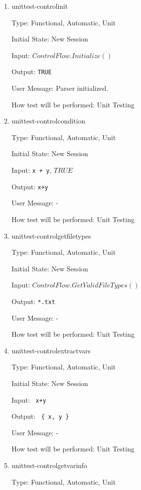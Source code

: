 \documentclass[12pt, titlepage]{article}
\begin{document}
\begin{enumerate}
	
	\item{unittest-controlinit}
	
	Type: Functional, Automatic, Unit
	
	Initial State: New Session
	
	Input: $ControlFlow.Initialize()$
	
	Output: \texttt{TRUE}
	
	User Message: Parser initialized.
	
	How test will be performed: Unit Testing\\
	
	\item{unittest-controlcondition}
	
	Type: Functional, Automatic, Unit
	
	Initial State: New Session
	
	Input: \texttt{x + y}, $TRUE$
	
	Output: \texttt{x+y}
	
	User Message: -
	
	How test will be performed: Unit Testing\\
	
	\item{unittest-controlgetfiletypes}
	
	Type: Functional, Automatic, Unit
	
	Initial State: New Session
	
	Input: $ControlFlow.GetValidFileTypes()$
	
	Output: \texttt{*.txt}
	
	User Message: -
	
	How test will be performed: Unit Testing\\
	
	\item{unittest-controlextractvars}
	
	Type: Functional, Automatic, Unit
	
	Initial State: New Session
	
	Input: \texttt{ x+y }
	
	Output: \texttt{ \{ x, y \}}
	
	User Message: -
	
	How test will be performed: Unit Testing\\
	
	\item{unittest-controlgetvarinfo}
	
	Type: Functional, Automatic, Unit
	

\end{enumerate}
\end{document}

